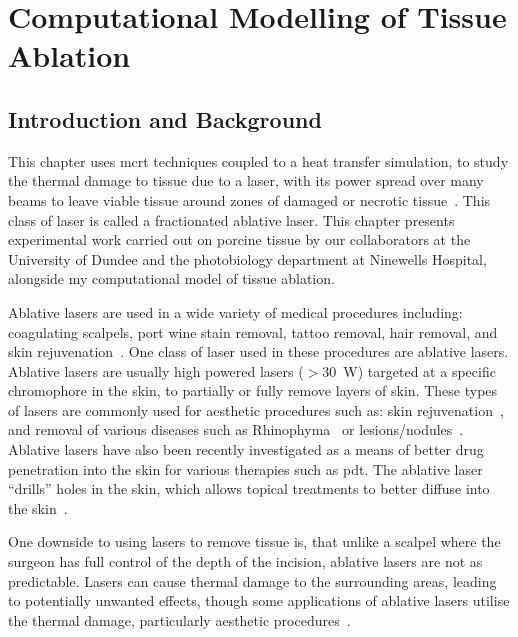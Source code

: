 \chapter{Computational Modelling of Tissue Ablation}
\label{chap:ablation}
\section{Introduction and Background}
\label{sec:intro}

This chapter uses \gls*{mcrt} techniques coupled to a heat transfer simulation, to study the thermal damage to tissue due to a laser, with its power spread over many beams to leave viable tissue around zones of damaged or necrotic tissue~\cite{manstein2004fractional}. This class of laser is called a fractionated ablative laser. This chapter presents experimental work carried out on porcine tissue by our collaborators at the University of Dundee and the photobiology department at Ninewells Hospital, alongside my computational model of tissue ablation.

\medskip

Ablative lasers are used in a wide variety of medical procedures including: coagulating scalpels, port wine stain removal, tattoo removal, hair removal, and skin rejuvenation~\cite{amini2010ultrafast, tan1989treatment,kuperman2001laser,liew2002laser,hardaway2002nonablative}.
One class of laser used in these procedures are ablative lasers. Ablative lasers are usually high powered lasers ($>$30~W) targeted at a specific chromophore in the skin, to partially or fully remove layers of skin. These types of lasers are commonly used for aesthetic procedures such as: skin rejuvenation~\cite{hardaway2002nonablative}, and removal of various diseases such as Rhinophyma~\cite{shapshay1980removal} or lesions/nodules~\cite{valcavi2010percutaneous}. Ablative lasers have also been recently investigated as a means of better drug penetration into the skin for various therapies such as \gls*{pdt}. The ablative laser ``drills'' holes in the skin, which allows topical treatments to better diffuse into the skin~\cite{haedersdal2010fractional}.

One downside to using lasers to remove tissue is, that unlike a scalpel where the surgeon has full control of the depth of the incision, ablative lasers are not as predictable. Lasers can cause thermal damage to the surrounding areas, leading to potentially  unwanted effects, though some applications of ablative lasers utilise the thermal damage, particularly aesthetic procedures~\cite{alexiades2008spectrum}.

